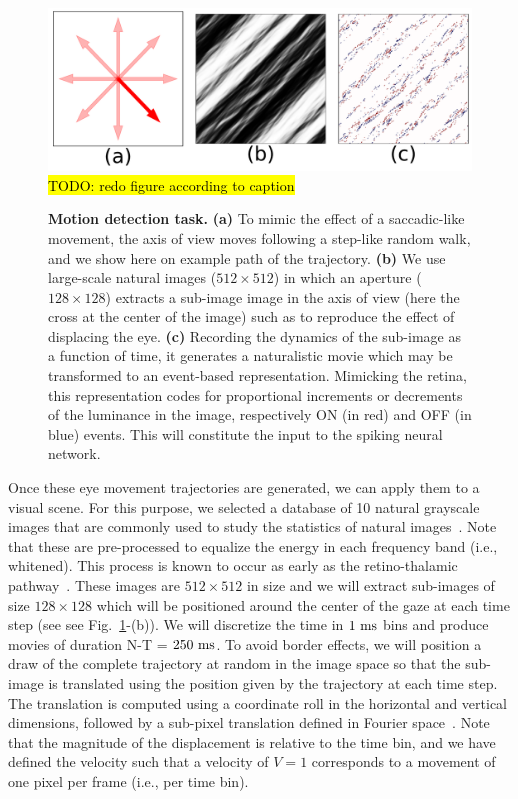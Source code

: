 \documentclass[default]{sn-jnl}%
\theoremstyle{thmstyleone}%
\theoremstyle{thmstyletwo}%
\theoremstyle{thmstylethree}%
\newcommand{\seeFig}[1]{see Fig.~\ref{fig:#1}}%
\DeclareRobustCommand{\note}[1]{{\sethlcolor{yellow}\hl{#1}}}
\begin{document}
\begin{figure}[h!]%
    \centering
    \includegraphics[width=0.95\linewidth]{figures/motion-task.pdf}
    \note{TODO: redo figure according to caption}
    \caption{
    {\bf Motion detection task.} {\bf (a)} To mimic the effect of a saccadic-like movement, the axis of view moves following a step-like random walk, and we show here on example path of the trajectory. {\bf (b)} We use large-scale natural images ($512\times512$) in which an aperture ($128\times128$) extracts a sub-image image in the axis of view (here the cross at the center of the image) such as to reproduce the effect of displacing the eye. {\bf (c)} Recording the dynamics of the sub-image as a function of time, it generates a naturalistic movie which may be transformed to an event-based representation. Mimicking the retina, this representation codes for proportional increments or decrements of the luminance in the image, respectively ON (in red) and OFF (in blue) events. This will constitute the input to the spiking neural network.}
    \label{fig:motion-task}
\end{figure}
Once these eye movement trajectories are generated, we can apply them to a visual scene. For this purpose, we selected a database of 10 natural grayscale images that are commonly used to study the statistics of natural images~\citep{olshausen 96}. Note that these are pre-processed to equalize the energy in each frequency band (i.e., whitened). This process is known to occur as early as the retino-thalamic pathway~\citep{dan 1996}. These images are $512 \times 512$ in size and we will extract sub-images of size $128 \times 128$ which will be positioned around the center of the gaze at each time step (see \seeFig{motion-task}-(b)). We will discretize the time in $1~\si{\milli\second}$ bins and produce movies of duration N-T = $250~\si{\milli\second}$. To avoid border effects, we will position a draw of the complete trajectory at random in the image space so that the sub-image is translated using the position given by the trajectory at each time step. The translation is computed using a coordinate roll in the horizontal and vertical dimensions, followed by a sub-pixel translation defined in Fourier space~\citep{Perrinet, 2015}. Note that the magnitude of the displacement is relative to the time bin, and we have defined the velocity such that a velocity of $V=1$ corresponds to a movement of one pixel per frame (i.e., per time bin).
\end{document}
